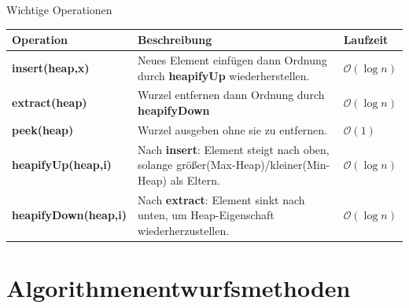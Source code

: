 \documentclass[aspectratio=169,xcolor=dvipsnames, t]{beamer}
\begin{document}
\begin{frame}{Wichtige Operationen}

\small
\renewcommand{\arraystretch}{1.5}

\begin{center}
\begin{tabular}{p{3cm} p{8.5cm} p{2.3cm}}
\textbf{Operation} & \textbf{Beschreibung} & \textbf{Laufzeit} \\ \hline

\textbf{insert(heap,x)} &
Neues Element einfügen dann Ordnung durch \textbf{heapifyUp} wiederherstellen. &
$\mathcal{O}(\log n)$ \\[4pt]

\textbf{extract(heap)} &
Wurzel entfernen dann Ordnung durch \textbf{heapifyDown} &
$\mathcal{O}(\log n)$ \\[4pt]

\textbf{peek(heap)} &
Wurzel ausgeben ohne sie zu entfernen. &
$\mathcal{O}(1)$ \\[4pt]

\textbf{heapifyUp(heap,i)} &
Nach \textbf{insert}: Element steigt nach oben, solange größer(Max-Heap)/kleiner(Min-Heap) als Eltern. &
$\mathcal{O}(\log n)$ \\[4pt]

\textbf{heapifyDown(heap,i)} &
Nach \textbf{extract}: Element sinkt nach unten, um Heap-Eigenschaft wiederherzustellen. &
$\mathcal{O}(\log n)$ \\[4pt]

\end{tabular}
\end{center}

\end{frame}

\section{Algorithmenentwurfsmethoden}
\end{document}
